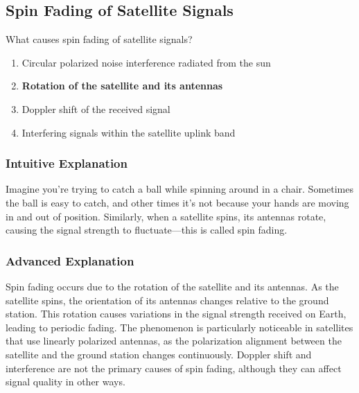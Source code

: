 \subsection{Spin Fading of Satellite Signals}
\label{T8B09}

\begin{tcolorbox}[colback=gray!10!white,colframe=black!75!black,title=T8B09]
What causes spin fading of satellite signals?
\begin{enumerate}[noitemsep]
    \item Circular polarized noise interference radiated from the sun
    \item \textbf{Rotation of the satellite and its antennas}
    \item Doppler shift of the received signal
    \item Interfering signals within the satellite uplink band
\end{enumerate}
\end{tcolorbox}

\subsubsection*{Intuitive Explanation}
Imagine you're trying to catch a ball while spinning around in a chair. Sometimes the ball is easy to catch, and other times it's not because your hands are moving in and out of position. Similarly, when a satellite spins, its antennas rotate, causing the signal strength to fluctuate—this is called spin fading.

\subsubsection*{Advanced Explanation}
Spin fading occurs due to the rotation of the satellite and its antennas. As the satellite spins, the orientation of its antennas changes relative to the ground station. This rotation causes variations in the signal strength received on Earth, leading to periodic fading. The phenomenon is particularly noticeable in satellites that use linearly polarized antennas, as the polarization alignment between the satellite and the ground station changes continuously. Doppler shift and interference are not the primary causes of spin fading, although they can affect signal quality in other ways.